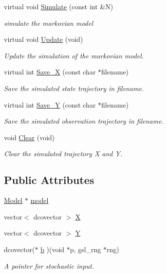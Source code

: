 \begin{CompactItemize}
virtual void \hyperlink{class_simulator_72b85e07dd0f69c4efac9178fbd2760a}{Simulate} (const int \&N)
\begin{CompactList}\small\item\em simulate the markovian model \item\end{CompactList}\item 
virtual void \hyperlink{class_simulator_7d25eafb65a104053c4fcb676ca71d1f}{Update} (void)
\begin{CompactList}\small\item\em Update the simulation of the markovian model. \item\end{CompactList}\item 
virtual int \hyperlink{class_simulator_47da05750f6f78051dcdecb5da666653}{Save\_\-X} (const char $\ast$filename)
\begin{CompactList}\small\item\em Save the simulated state trajectory in filename. \item\end{CompactList}\item 
virtual int \hyperlink{class_simulator_2cc53f33162bf08a6ae187ad4d34fe6e}{Save\_\-Y} (const char $\ast$filename)
\begin{CompactList}\small\item\em Save the simulated observation trajectory in filename. \item\end{CompactList}\item 
void \hyperlink{class_simulator_7f2f4f851a59b2e566692926c3a87940}{Clear} (void)
\begin{CompactList}\small\item\em Clear the simulated trajectory X and Y. \item\end{CompactList}\end{CompactItemize}
\subsection*{Public Attributes}
\begin{CompactItemize}
\item 
\hyperlink{class_model}{Model} $\ast$ \hyperlink{class_simulator_ab8f86e4e70af8f5a1a6c885e03d9bed}{model}
\item 
vector$<$ dcovector $>$ \hyperlink{class_simulator_a2db8ace19099d996be516022d230bc0}{X}
\item 
vector$<$ dcovector $>$ \hyperlink{class_simulator_403a127c909abf3e4c6d48a287315987}{Y}
\item 
dcovector($\ast$ \hyperlink{class_simulator_b5b842f75497c70ddb2edcaa5f731506}{b} )(void $\ast$p, gsl\_\-rng $\ast$rng)
\begin{CompactList}\small\item\em A pointer for stochastic input. \item\end{CompactList}\end{CompactItemize}
